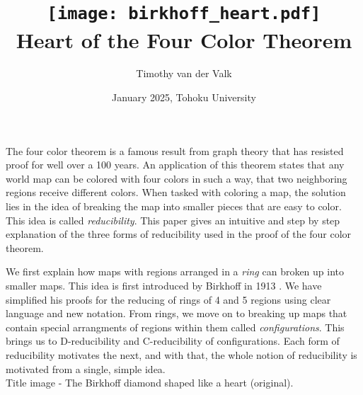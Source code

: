 \documentclass{article}
\title{\vspace{-2cm}\texttt{[image: birkhoff\_heart.pdf]}\\\vspace{0.5cm} Heart of the Four Color Theorem}
\author{Timothy van der Valk}
\date{January 2025, Tohoku University}
\begin{document}
\maketitle

The four color theorem is a famous result from graph theory that has resisted proof for well over a 100 years. An application of this theorem states that any world map can be colored with four colors in such a way, that two neighboring regions receive different colors. When tasked with coloring a map, the solution lies in the idea of breaking the map into smaller pieces that are easy to color. This idea is called \textit{reducibility}. This paper gives an intuitive and step by step explanation of the three forms of reducibility used in the proof of the four color theorem. 

We first explain how maps with regions arranged in a \textit{ring} can broken up into smaller maps. This idea is first introduced by Birkhoff in 1913 \cite{birkhoff}. We have simplified his proofs for the reducing of rings of 4 and 5 regions using clear language and new notation. From rings, we move on to breaking up maps that contain special arrangments of regions within them called \textit{configurations}. This brings us to D-reducibility and C-reducibility of configurations. Each form of reducibility motivates the next, and with that, the whole notion of reducibility is motivated from a single, simple idea.
\vspace{0.1cm}\\
{ \tiny Title image - The Birkhoff diamond shaped like a heart (original). }

\pagebreak

\pagebreak


\tableofcontents

\pagebreak








\pagebreak
\printbibliography
\end{document}
